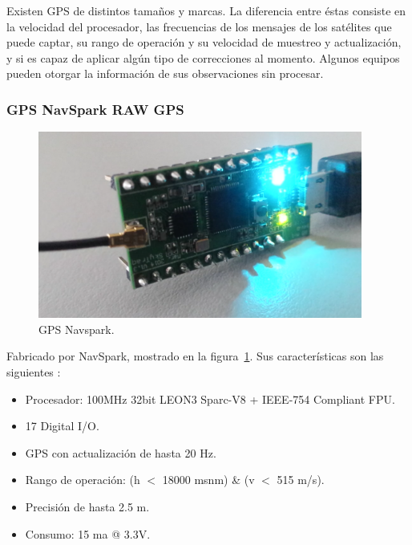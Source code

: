 Existen GPS de distintos tamaños y marcas. La diferencia entre éstas consiste en la velocidad del procesador, las frecuencias de los mensajes de los satélites que puede captar, su rango de operación y su velocidad de muestreo y actualización, y si es capaz de aplicar algún tipo de correcciones al momento. Algunos equipos pueden otorgar la información de sus observaciones sin procesar.

\subsubsection{GPS NavSpark RAW GPS}

\begin{figure}[H]
\centering
\includegraphics[width=0.95\textwidth]{Figures/NavGPS}
\caption[GPS Navspark.]{GPS Navspark.}
\label{fig:nsraw}
\end{figure}

Fabricado por NavSpark, mostrado en la figura~\ref{fig:nsraw}. Sus características son las siguientes \citep{nsraw}:

\begin{itemize}
\item Procesador: 100MHz 32bit LEON3 Sparc-V8 + IEEE-754 Compliant FPU.
\item 17 Digital I/O.\\
\item GPS con actualización de hasta 20 Hz.\\
\item Rango de operación: (h $<$ 18000 msnm) \& (v $<$ 515 m/s).\\
\item Precisión de hasta 2.5 m.\\
\item Consumo: 15 ma @ 3.3V.\\
\end{itemize}


